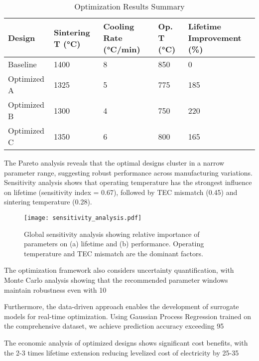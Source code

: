 \documentclass[10pt,conference]{IEEEtran}
\begin{document}
\begin{table}[H]
\centering
\caption{Optimization Results Summary}
\label{tab:optimization_results}
\begin{tabular}{@{}lllll@{}}
\toprule
Design & Sintering T (°C) & Cooling Rate (°C/min) & Op. T (°C) & Lifetime Improvement (\%) \\
\midrule
Baseline & 1400 & 8 & 850 & 0 \\
Optimized A & 1325 & 5 & 775 & 185 \\
Optimized B & 1300 & 4 & 750 & 220 \\
Optimized C & 1350 & 6 & 800 & 165 \\
\bottomrule
\end{tabular}
\end{table}

The Pareto analysis reveals that the optimal designs cluster in a narrow parameter range, suggesting robust performance across manufacturing variations. Sensitivity analysis shows that operating temperature has the strongest influence on lifetime (sensitivity index = 0.67), followed by TEC mismatch (0.45) and sintering temperature (0.28).

\begin{figure}[H]
\centering
\texttt{[image: sensitivity\_analysis.pdf]}
\caption{Global sensitivity analysis showing relative importance of parameters on (a) lifetime and (b) performance. Operating temperature and TEC mismatch are the dominant factors.}
\label{fig:sensitivity_analysis}
\end{figure}

The optimization framework also considers uncertainty quantification, with Monte Carlo analysis showing that the recommended parameter windows maintain robustness even with 10%

Furthermore, the data-driven approach enables the development of surrogate models for real-time optimization. Using Gaussian Process Regression trained on the comprehensive dataset, we achieve prediction accuracy exceeding 95%

The economic analysis of optimized designs shows significant cost benefits, with the 2-3 times lifetime extension reducing levelized cost of electricity by 25-35%
\end{document}
